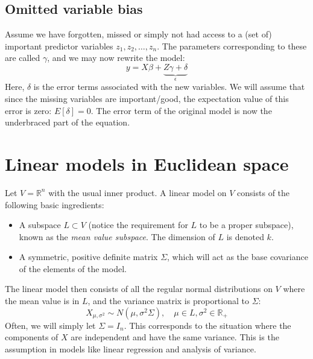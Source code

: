 \documentclass[12pt, a4paper]{article}
\begin{document}
\subsection{Omitted variable bias}
Assume we have forgotten, missed or simply not had access to a (set of) important predictor variables $z_1, z_2,\ldots, z_n$. The parameters corresponding to these are called $\gamma$, and we may now rewrite the model:
\begin{equation}
y=X\beta+\underbrace{Z\gamma+\delta}_{\epsilon}
\end{equation}
Here, $\delta$ is the error terms associated with the new variables. We will assume that since the missing variables are important/good, the expectation value of this error is zero: $E[\delta]=0$. The error term of the original model is now the underbraced part of the equation.

\section{Linear models in Euclidean space}
Let $V=\mathbb{R}^n$ with the usual inner product. A linear model on $V$ consists of the following basic ingredients:
\begin{itemize}
\item A subspace $L\subset V$ (notice the requirement for $L$ to be a proper subspace), known as the \textit{mean value subspace}. The dimension of $L$ is denoted $k$.
\item A symmetric, positive definite matrix $\Sigma$, which will act as the base covariance of the elements of the model.
\end{itemize}
The linear model then consists of all the regular normal distributions on $V$ where the mean value is in $L$, and the variance matrix is proportional to $\Sigma$:
\begin{equation}
X_{\mu,\sigma^2}\sim N\left(\mu,\sigma^2\Sigma\right),\quad\mu\in L,\sigma^2\in\mathbb{R}_+
\end{equation}
Often, we will simply let $\Sigma=I_n$. This corresponds to the situation where the components of $X$ are independent and have the same variance. This is the assumption in models like linear regression and analysis of variance.
\end{document}
